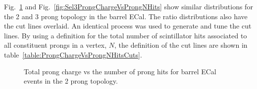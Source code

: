 \newline
\newline
Fig.~\ref{fig:Sel2ProngChargeVsProngNHits} and Fig.~\ref{fig:Sel3ProngChargeVsProngNHits} show similar distributions for the 2 and 3 prong topology in the barrel ECal.  The ratio distributions also have the cut lines overlaid.  An identical process was used to generate and tune the cut lines.  By using a definition for the total number of scintillator hits associated to all constituent prongs in a vertex, $N$, the definition of the cut lines are shown in table~\ref{table:ProngChargeVsProngNHitsCuts}.
\begin{figure}
\begin{minipage}{.5\linewidth}
  \centering
\end{minipage}%
\begin{minipage}{.5\linewidth}
\centering
{}
\end{minipage}\par\medskip
\centering
{}
\caption{Total prong charge vs the number of prong hits for barrel ECal events in the 2 prong topology.}
\label{fig:Sel2ProngChargeVsProngNHits}
\end{figure}
